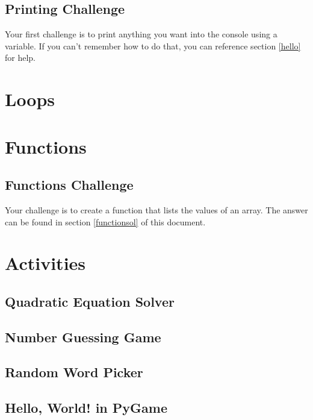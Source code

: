 \documentclass[12pt, letterpaper]{article}
\begin{document}
    \subsection{Printing Challenge} \label{hellochallenge}
    
    Your first challenge is to print anything you want into the console using a variable. If you can't remember how to do that, you can reference section \ref{hello} for help.

    \section{Loops} \label{loops}

    \section{Functions} \label{functions}

    \subsection{Functions Challenge} \label{functionschallenge}

    Your challenge is to create a function that lists the values of an array. The answer can be found in section \ref{functionsol} of this document.


    \section{Activities} \label{activities}

    \subsection{Quadratic Equation Solver} \label{quadsolver}

    \subsection{Number Guessing Game} \label{numbergame}

    \subsection{Random Word Picker} \label{randomword}

    \subsection{Hello, World! in PyGame} \label{hellopygame}
\end{document}
